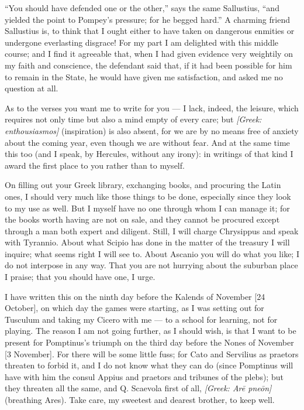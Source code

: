  ``You should have defended one or the other,'' says the same Sallustius, ``and yielded the point to Pompey's pressure; for he begged hard.'' A charming friend Sallustius is, to think that I ought either to have taken on dangerous enmities or undergone everlasting disgrace! For my part I am delighted with this middle course; and I find it agreeable that, when I had given evidence very weightily on my faith and conscience, the defendant said that, if it had been possible for him to remain in the State, he would have given me satisfaction, and asked me no question at all.

 As to the verses you want me to write for you --- I lack, indeed, the leisure, which requires not only time but also a mind empty of every care; but \textit{[Greek: enthousiasmos]} (inspiration) is also absent, for we are by no means free of anxiety about the coming year, even though we are without fear. And at the same time this too (and I speak, by Hercules, without any irony): in writings of that kind I award the first place to you rather than to myself.

 On filling out your Greek library, exchanging books, and procuring the Latin ones, I should very much like those things to be done, especially since they look to my use as well. But I myself have no one through whom I can manage it; for the books worth having are not on sale, and they cannot be procured except through a man both expert and diligent. Still, I will charge Chrysippus and speak with Tyrannio. About what Scipio has done in the matter of the treasury I will inquire; what seems right I will see to. About Ascanio you will do what you like; I do not interpose in any way. That you are not hurrying about the suburban place I praise; that you should have one, I urge.

 I have written this on the ninth day before the Kalends of November [24 October], on which day the games were starting, as I was setting out for Tusculum and taking my Cicero with me --- to a school for learning, not for playing. The reason I am not going further, as I should wish, is that I want to be present for Pomptinus's triumph on the third day before the Nones of November [3 November]. For there will be some little fuss; for Cato and Servilius as praetors threaten to forbid it, and I do not know what they can do (since Pomptinus will have with him the consul Appius and praetors and tribunes of the plebs); but they threaten all the same, and Q. Scaevola first of all, \textit{[Greek: Ar\=e pne\=on]} (breathing Ares). Take care, my sweetest and dearest brother, to keep well.
